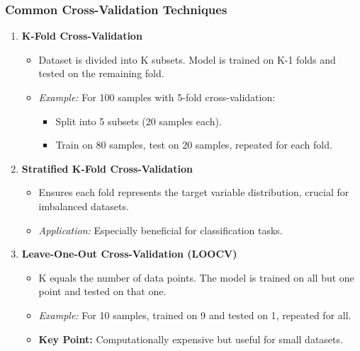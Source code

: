 \documentclass[aspectratio=169]{beamer}
\begin{document}
\begin{frame}[fragile]
    \frametitle{Common Cross-Validation Techniques}
    \begin{enumerate}
        \item \textbf{K-Fold Cross-Validation}
        \begin{itemize}
            \item Dataset is divided into K subsets. Model is trained on K-1 folds and tested on the remaining fold.
            \item \textit{Example:} For 100 samples with 5-fold cross-validation:
                \begin{itemize}
                    \item Split into 5 subsets (20 samples each).
                    \item Train on 80 samples, test on 20 samples, repeated for each fold.
                \end{itemize}
        \end{itemize}
        
        \item \textbf{Stratified K-Fold Cross-Validation}
        \begin{itemize}
            \item Ensures each fold represents the target variable distribution, crucial for imbalanced datasets.
            \item \textit{Application:} Especially beneficial for classification tasks.
        \end{itemize}
        
        \item \textbf{Leave-One-Out Cross-Validation (LOOCV)}
        \begin{itemize}
            \item K equals the number of data points. The model is trained on all but one point and tested on that one.
            \item \textit{Example:} For 10 samples, trained on 9 and tested on 1, repeated for all.
            \item \textbf{Key Point:} Computationally expensive but useful for small datasets.
        \end{itemize}
    \end{enumerate}
\end{frame}
\end{document}
